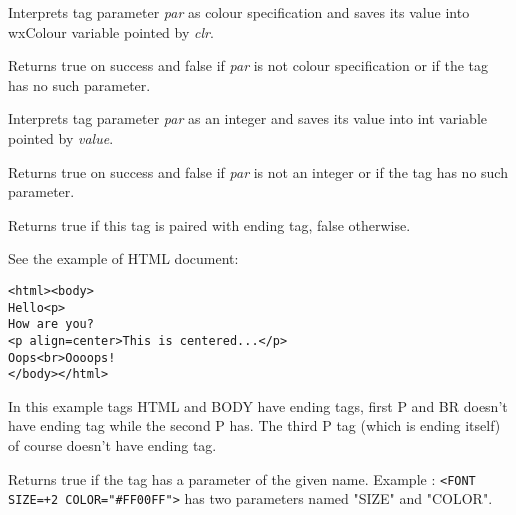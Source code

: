 \label{wxhtmltaggetparamascolour}


Interprets tag parameter {\it par} as colour specification and saves its value
into wxColour variable pointed by {\it clr}.

Returns true on success and false if {\it par} is not colour specification or
if the tag has no such parameter.

\label{wxhtmltaggetparamasint}


Interprets tag parameter {\it par} as an integer and saves its value
into int variable pointed by {\it value}.

Returns true on success and false if {\it par} is not an integer or
if the tag has no such parameter.

\label{wxhtmltaghasending}


Returns true if this tag is paired with ending tag, false otherwise.

See the example of HTML document:

\begin{verbatim}
<html><body>
Hello<p>
How are you?
<p align=center>This is centered...</p>
Oops<br>Oooops!
</body></html>
\end{verbatim}

In this example tags HTML and BODY have ending tags, first P and BR 
doesn't have ending tag while the second P has. The third P tag (which
is ending itself) of course doesn't have ending tag.

\label{wxhtmltaghasparam}


Returns true if the tag has a parameter of the given name. 
Example : {\tt <FONT SIZE=+2 COLOR="\#FF00FF">} has two parameters named
"SIZE" and "COLOR".



\label{wxhtmltagscanparam}

